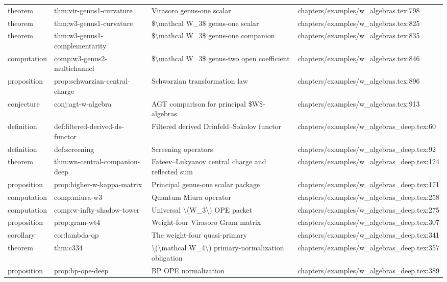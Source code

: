 \documentclass[11pt]{article}
\begin{document}
\begin{longtable}{L{0.10\textwidth}L{0.26\textwidth}L{0.42\textwidth}L{0.22\textwidth}}
theorem & thm:vir-genus1-curvature & Virasoro genus-one scalar & chapters/examples/w\_algebras.tex:798\\
theorem & thm:w3-genus1-curvature & \$\textbackslash{}mathcal W\_3\$ genus-one scalar & chapters/examples/w\_algebras.tex:825\\
theorem & thm:w3-genus1-complementarity & \$\textbackslash{}mathcal W\_3\$ genus-one companion & chapters/examples/w\_algebras.tex:835\\
computation & comp:w3-genus2-multichannel & \$\textbackslash{}mathcal W\_3\$ genus-two op{}en coefficient & chapters/examples/w\_algebras.tex:846\\
proposition & prop:schwarzian-central-charge & Schwarzian transformation law & chapters/examples/w\_algebras.tex:896\\
conjecture & conj:agt-w-algebra & AGT comparison for principal \$W\$-algebras & chapters/examples/w\_algebras.tex:913\\
definition & def:filtered-derived-ds-functor & Filtered derived Drinfeld--Sokolov functor & chapters/examples/w\_algebras\_deep.tex:60\\
definition & def:screening & Screening operators & chapters/examples/w\_algebras\_deep.tex:92\\
theorem & thm:wn-central-companion-deep & Fateev--Lukyanov central charge and reflected sum & chapters/examples/w\_algebras\_deep.tex:124\\
proposition & prop:higher-w-kappa-matrix & Principal genus-one scalar package & chapters/examples/w\_algebras\_deep.tex:171\\
computation & comp:miura-w3 & Quantum Miura operator & chapters/examples/w\_algebras\_deep.tex:258\\
computation & comp:w-infty-shadow-tower & Universal \textbackslash{}(W\_3\textbackslash{}) OPE packet & chapters/examples/w\_algebras\_deep.tex:275\\
proposition & prop:gram-wt4 & Weight-four Virasoro Gram matrix & chapters/examples/w\_algebras\_deep.tex:307\\
corollary & cor:lambda-qp & The weight-four quasi-primary & chapters/examples/w\_algebras\_deep.tex:341\\
theorem & thm:c334 & \textbackslash{}(\textbackslash{}mathcal W\_4\textbackslash{}) primary-normalization obligation & chapters/examples/w\_algebras\_deep.tex:357\\
proposition & prop:bp-ope-deep & BP OPE normalization & chapters/examples/w\_algebras\_deep.tex:389\\

\end{longtable}
\end{document}

